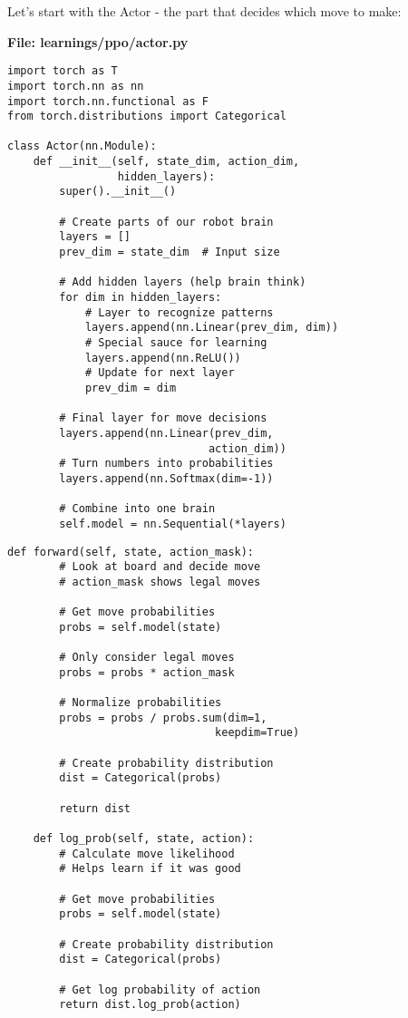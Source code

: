 \documentclass[11pt]{article}
\begin{document}
Let's start with the Actor - the part that decides which move to make:

\begin{tcolorbox}[colback=purple!5!white,colframe=purple!75!black,title=Building the Actor Network]
\textbf{File: learnings/ppo/actor.py}
\begin{minipage}[t]{0.48\textwidth}
\begin{lstlisting}[style=Python]
import torch as T
import torch.nn as nn
import torch.nn.functional as F
from torch.distributions import Categorical

class Actor(nn.Module):
    def __init__(self, state_dim, action_dim, 
                 hidden_layers):
        super().__init__()
        
        # Create parts of our robot brain
        layers = []
        prev_dim = state_dim  # Input size
        
        # Add hidden layers (help brain think)
        for dim in hidden_layers:
            # Layer to recognize patterns
            layers.append(nn.Linear(prev_dim, dim))
            # Special sauce for learning
            layers.append(nn.ReLU())
            # Update for next layer
            prev_dim = dim
        
        # Final layer for move decisions
        layers.append(nn.Linear(prev_dim, 
                               action_dim))
        # Turn numbers into probabilities
        layers.append(nn.Softmax(dim=-1))
        
        # Combine into one brain
        self.model = nn.Sequential(*layers)
\end{lstlisting}
\end{minipage}\hfill
\begin{minipage}[t]{0.48\textwidth}
\begin{lstlisting}[style=Python]
    def forward(self, state, action_mask):
        # Look at board and decide move
        # action_mask shows legal moves
        
        # Get move probabilities
        probs = self.model(state)
        
        # Only consider legal moves
        probs = probs * action_mask
        
        # Normalize probabilities
        probs = probs / probs.sum(dim=1, 
                                keepdim=True)
        
        # Create probability distribution
        dist = Categorical(probs)
        
        return dist
    
    def log_prob(self, state, action):
        # Calculate move likelihood
        # Helps learn if it was good
        
        # Get move probabilities
        probs = self.model(state)
        
        # Create probability distribution
        dist = Categorical(probs)
        
        # Get log probability of action
        return dist.log_prob(action)
\end{lstlisting}
\end{minipage}
\end{tcolorbox}
\end{document}
